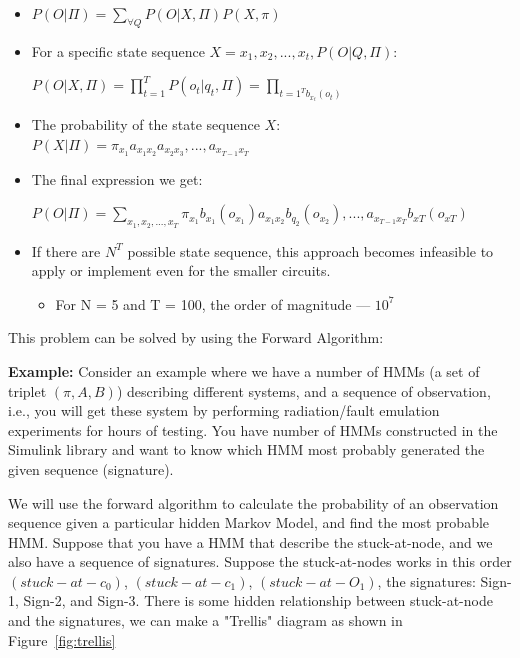 \begin{itemize}

\item  $P(O | \Pi) = \sum\limits_{\forall Q}^{} P (O | X, \Pi) P (X, \pi)$ 

\item For a specific state sequence $X = {x_1, x_2,...,x_t}, P(O | Q, \Pi):$

 \hspace {0.2cm} $P (O | X, \Pi) = \prod_{t=1}^{T} P (o_t | q_t, \Pi) = \prod_{t=1^{T} b_{x_t} (o_t)}$
 
 \item The probability of the state sequence $X$:
 \\
 \hspace {0.2cm} $ P (X | \Pi ) = \pi_{x_1} a_{x_1 x_2} a_{x_2 x_3},...,a_{x_{T-1} x_T}$
 
 \item The final expression we get:
 


$P (O | \Pi ) = \sum\limits_{x_1, x_2,..., x_T} \pi_{x_1} b_{x_1} (o_{x_1}) a_{x_1 x_2} b_{q_2} (o_{x_2}),..., a_{x_{T-1} x_T} b_{xT} (o_{xT})$

\item If there are $N^T$ possible state sequence, this approach becomes infeasible to apply or implement even for the smaller circuits.

\begin{itemize}
\item For N = 5 and T = 100, the order of magnitude --- $10^7$
\end{itemize}
 

\end{itemize}

This problem can be solved by using the Forward Algorithm:

\textbf{Example:} Consider an example where we have a number of HMMs (a set of triplet $(\pi, A, B)$) describing different systems, and a sequence of observation, i.e., you will get these system by performing radiation/fault emulation experiments for hours of testing. You have number of HMMs constructed in the Simulink library and want to know which HMM most probably generated the given sequence (signature).


We will use the forward algorithm to calculate the probability of an observation sequence given a particular hidden Markov Model, and find the most probable HMM. Suppose that you have a HMM that describe the stuck-at-node, and we also have a sequence of signatures. Suppose the stuck-at-nodes works in this order $(stuck-at-c_0)$, $(stuck-at-c_1)$, $(stuck-at-O_1)$, the signatures: Sign-1, Sign-2, and Sign-3. There is some hidden relationship between stuck-at-node and the signatures, we can make a "Trellis" diagram as shown in Figure~\ref{fig:trellis}



